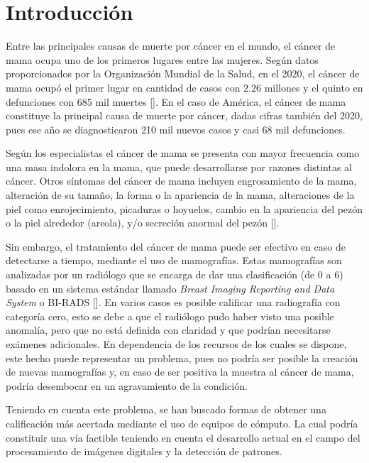 \chapter*{Introducción}\label{chapter:introduction}

\par Entre las principales causas de muerte por c\'ancer en el mundo, el c\'ancer de mama ocupa uno de los primeros lugares entre las mujeres. Seg\'un datos proporcionados por la Organizaci\'on Mundial de la Salud, en el 2020, el c\'ancer de mama ocup\'o el primer lugar en cantidad de casos con $2.26$ millones y el quinto en defunciones con 685 mil muertes [\cite{16}]. En el caso de Am\'erica, el c\'ancer de mama constituye la principal causa de muerte por c\'ancer, dadas cifras tambi\'en del 2020, pues ese a\~no se diagnosticaron 210 mil nuevos casos y casi 68 mil defunciones.

\par Seg\'un los especialistas el cáncer de mama se presenta con mayor frecuencia como una masa indolora en la mama, que puede desarrollarse por razones distintas al cáncer. Otros síntomas del cáncer de mama incluyen engrosamiento de la mama, alteración de su tamaño, la forma o la apariencia de la mama, alteraciones de la piel como enrojecimiento, picaduras o hoyuelos, cambio en la apariencia del pezón o la piel alrededor (areola), y/o secreción anormal del pezón [\cite{17}].

\par Sin embargo, el tratamiento del c\'ancer de mama puede ser efectivo en caso de detectarse a tiempo, mediante el uso de mamograf\'ias. Estas mamograf\'ias son analizadas por un radi\'ologo que se encarga de dar una clasificaci\'on (de 0 a 6) basado en un sistema est\'andar llamado \textit{Breast Imaging Reporting and Data System} o BI-RADS [\cite{19}]. En varios casos es posible calificar una radiograf\'ia con categor\'ia cero, esto se debe a que el radi\'ologo pudo haber visto una posible anomalía, pero que no está definida con claridad y que podr\'ian necesitarse exámenes adicionales. En dependencia de los recursos de los cuales se dispone, este hecho puede representar un problema, pues no podr\'ia ser posible la creaci\'on de nuevas mamograf\'ias y, en caso de ser positiva la muestra al c\'ancer de mama, podr\'ia desembocar en un agravamiento de la condici\'on.

\par Teniendo en cuenta este problema, se han buscado formas de obtener una calificaci\'on m\'as acertada mediante el uso de equipos de c\'omputo. La cual podr\'ia constituir una v\'ia factible teniendo en cuenta el desarrollo actual en el campo del procesamiento de im\'agenes digitales y la detecci\'on de patrones.

